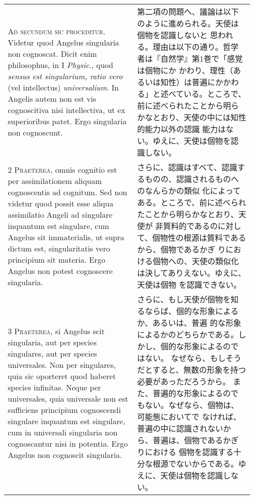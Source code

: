 \documentclass[10pt]{jsarticle} %
\begin{document}
\begin{longtable}{p{21em}p{21em}}


{\huge A}{\scshape d secundum sic proceditur}. Videtur quod Angelus
singularia non cognoscat. Dicit enim philosophus, in I {\itshape
Physic}., quod {\itshape sensus est singularium, ratio vero} (vel
intellectus) {\itshape universalium}. In Angelis autem non est vis
cognoscitiva nisi intellectiva, ut ex superioribus patet. Ergo
singularia non cognoscunt.


&

第二項の問題へ、議論は以下のように進められる。天使は個物を認識しないと
思われる。理由は以下の通り。哲学者は『自然学』第1巻で「感覚は個物にか
かわり、理性（あるいは知性）は普遍にかかわる」と述べている。ところで、
前に述べられたことから明らかなとおり、天使の中には知性的能力以外の認識
能力はない。ゆえに、天使は個物を認識しない。


\\


{\scshape 2 Praeterea}, omnis cognitio est per assimilationem aliquam
cognoscentis ad cognitum. Sed non videtur quod possit esse aliqua
assimilatio Angeli ad singulare inquantum est singulare, cum Angelus
sit immaterialis, ut supra dictum est, singularitatis vero principium
sit materia. Ergo Angelus non potest cognoscere singularia.


&

さらに、認識はすべて、認識するものの、認識されるものへのなんらかの類似
化によってある。ところで、前に述べられたことから明らかなとおり、天使が
非質料的であるのに対して、個物性の根源は質料であるから、個物であるかぎ
りにおける個物への、天使の類似化は決してありえない。ゆえに、天使は個物
を認識できない。

\\


{\scshape 3 Praeterea}, si Angelus scit singularia, aut per species
singulares, aut per species universales. Non per singulares, quia sic
oporteret quod haberet species infinitas. Neque per universales, quia
universale non est sufficiens principium cognoscendi singulare
inquantum est singulare, cum in universali singularia non cognoscantur
nisi in potentia. Ergo Angelus non cognoscit singularia.


&

さらに、もし天使が個物を知るならば、個的な形象によるか、あるいは、普遍
的な形象によるかのどちらかである。しかし、個的な形象によるのではない。
なぜなら、もしそうだとすると、無数の形象を持つ必要があっただろうから。
また、普遍的な形象によるのでもない。なぜなら、個物は、可能態においてで
なければ、普遍の中に認識されないから、普遍は、個物であるかぎりにおける
個物を認識する十分な根源でないからである。ゆえに、天使は個物を認識しな
い。


\end{longtable}
\end{document}

